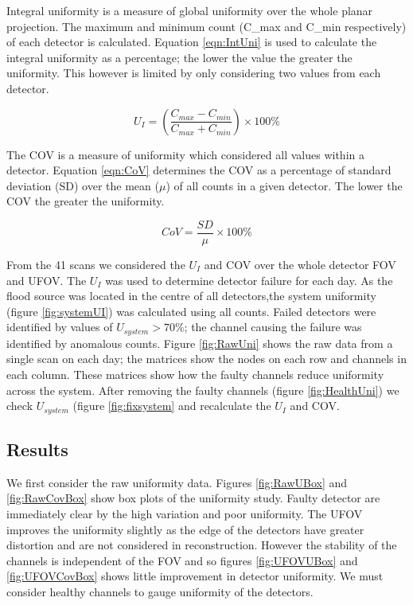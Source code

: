 Integral uniformity is a measure of global uniformity over the whole planar projection. The maximum and minimum count (C\_{max} and C\_{min} respectively) of each detector is calculated. Equation \ref{eqn:IntUni} is used to calculate the integral uniformity as a percentage; the lower the value the greater the uniformity. This however is limited by only considering two values from each detector. 

\begin{equation} \label{eqn:IntUni}
        U_I = (\frac{C_{max} - C_{min}}{C_{max} + C_{min}})\times100\%
\end{equation}

The \acrshort{COV} is a measure of uniformity which considered all values within a detector. Equation \ref{eqn:CoV} determines the \acrshort{COV} as a percentage of standard deviation (SD) over the mean ($\mu$) of all counts in a given detector. The lower the \acrshort{COV} the greater the uniformity. 

\begin{equation} \label{eqn:CoV}
        CoV = \frac{SD}{\mu}\times100\%
\end{equation}

From the 41 scans we considered the $U_I$ and \acrshort{COV} over the whole detector \acrshort{FOV} and \acrshort{UFOV}. The $U_I$ was used to determine detector failure for each day. As the flood source was located in the centre of all detectors,the system uniformity (figure \ref{fig:systemUI}) was calculated using all counts. Failed detectors were identified by values of $ U_{system} > 70\%$; the channel causing the failure was identified by anomalous counts. Figure \ref{fig:RawUni} shows the raw data from a single scan on each day; the matrices show the nodes on each row and channels in each column. These matrices show how the faulty channels reduce uniformity across the system. After removing the faulty channels (figure \ref{fig:HealthUni}) we check $U_{system}$ (figure \ref{fig:fixsystem} and recalculate the $U_I$ and \acrshort{COV}.

\subsection{Results}

We first consider the raw uniformity data. Figures \ref{fig:RawUBox} and \ref{fig:RawCovBox} show box plots of the uniformity study. Faulty detector are immediately clear by the high variation and poor uniformity. The \acrshort{UFOV} improves the uniformity slightly as the edge of the detectors have greater distortion and are not considered in reconstruction. However the stability of the channels is independent of the \acrshort{FOV} and so figures \ref{fig:UFOVUBox} and \ref{fig:UFOVCovBox} shows little improvement in detector uniformity. We must consider healthy channels to gauge uniformity of the detectors.

